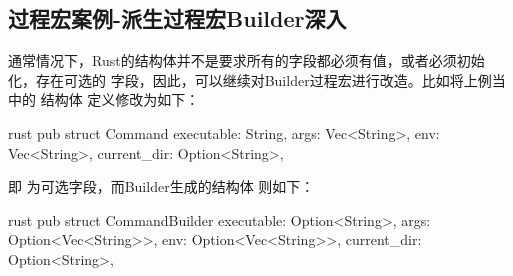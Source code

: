 \subsection{过程宏案例-派生过程宏Builder深入}
通常情况下，Rust的结构体并不是要求所有的字段都必须有值，或者必须初始化，存在可选的
字段，因此，可以继续对Builder过程宏进行改造。比如将上例当中的
结构体
定义修改为如下：
\begin{code-block}{rust}
pub struct Command {
    executable: String,
    args: Vec<String>,
    env: Vec<String>,
    current_dir: Option<String>,
}
\end{code-block}
即
为可选字段，而Builder生成的结构体
则如下：
\begin{code-block}{rust}
pub struct CommandBuilder {
    executable: Option<String>,
    args: Option<Vec<String>>,
    env: Option<Vec<String>>,
    current_dir: Option<String>,
}
\end{code-block}


